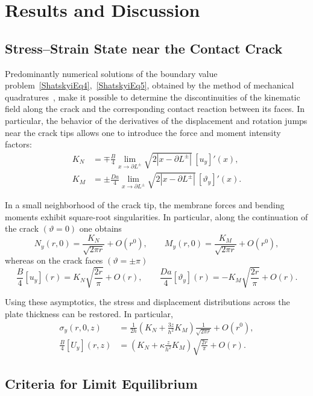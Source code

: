 \section{Results and Discussion}

\subsection{Stress--Strain State near the Contact Crack}

Predominantly numerical solutions of the boundary value problem~\eqref{ShatskyiEq4},~\eqref{ShatskyiEq5}, obtained by the method of mechanical quadratures~\cite{Shatskyi21}, make it possible to determine the discontinuities of the kinematic field along the crack and the corresponding contact reaction between its faces. In particular, the behavior of the derivatives of the displacement and rotation jumps near the crack tips allows one to introduce the force and moment intensity factors:
\begin{align*}
K_N &= \mp\frac{B}{4}\lim_{x\to\partial L^{\pm}}
\sqrt{2|x-\partial L^{\pm}|}\,[u_y]'(x),
\\
K_M &= \pm\frac{Da}{4}\lim_{x\to\partial L^{\pm}}
\sqrt{2|x-\partial L^{\pm}|}\,[\vartheta_y]'(x).
\end{align*}

In a small neighborhood of the crack tip, the membrane forces and bending moments exhibit square-root singularities. In particular, along the continuation of the crack $(\vartheta=0)$ one obtains
\[
N_y(r,0)=\frac{K_N}{\sqrt{2\pi r}}+O(r^0),
\qquad
M_y(r,0)=\frac{K_M}{\sqrt{2\pi r}}+O(r^0),
\]
whereas on the crack faces $(\vartheta=\pm\pi)$
\[
\frac{B}{4}[u_y](r)=K_N\sqrt{\frac{2r}{\pi}}+O(r),
\qquad
\frac{Da}{4}[\vartheta_y](r)=-K_M\sqrt{\frac{2r}{\pi}}+O(r).
\]

Using these asymptotics, the stress and displacement distributions across the plate thickness can be restored. In particular,
\begin{equation}
	\begin{aligned}
		\sigma_y(r,0,z) &=
		\frac{1}{2h}
		\left(
		K_N + \frac{3z}{h^2}K_M
		\right)
		\frac{1}{\sqrt{2\pi r}}
		+ O(r^0),
		\\
		\frac{B}{4}[U_y](r,z) &=
		\left(
		K_N + \kappa\frac{z}{h^2}K_M
		\right)
		\sqrt{\frac{2r}{\pi}}
		+ O(r).
	\end{aligned}
	\label{ShatskyiEq6}
\end{equation}

\subsection{Criteria for Limit Equilibrium}


